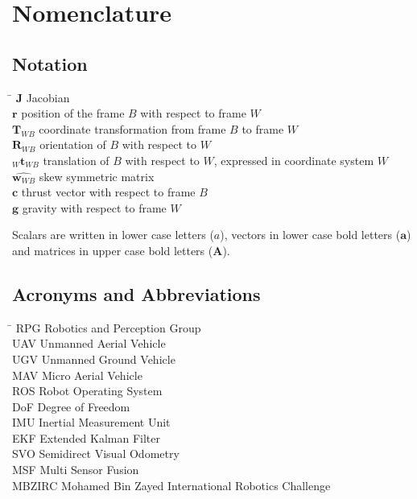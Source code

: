\chapter*{Nomenclature}\label{chap:symbole}

\section*{Notation}
  \begin{tabbing}
    \hspace*{1.6cm}   \= \kill
    $\mathbf{J}$       \> Jacobian \\[0.5ex]
    $\boldsymbol{r}$  \> position of the frame $B$ with respect to frame $W$ \\[0.5ex]
    $\mathbf{T}_{WB}$  \> coordinate transformation from frame $B$ to frame $W$ \\[0.5ex]
    $\mathbf{R}_{WB}$  \> orientation of $B$ with respect to $W$ \\[0.5ex]
    $_W\mathbf{t}_{WB}$\> translation of $B$ with respect to $W$, expressed in coordinate system $W$ \\[0.5ex]
    $\hat{\boldsymbol{w}_{WB}}$ \> skew symmetric matrix \\[0.5ex]
    $\boldsymbol{c}$  \> thrust vector with respect to frame $B$ \\[0.5ex]
    $\boldsymbol{g}$  \> gravity with respect to frame $W$ \\[0.5ex]
  \end{tabbing}
  
Scalars are written in lower case letters ($a$), vectors in lower case bold letters ($\mathbf{a}$) and matrices in upper case bold letters ($\mathbf{A}$).

\section*{Acronyms and Abbreviations}
  \begin{tabbing}
    \hspace*{1.6cm}  \= \kill
    RPG     \> Robotics and Perception Group \\[0.5ex]
    UAV     \> Unmanned Aerial Vehicle \\[0.5ex]
    UGV     \> Unmanned Ground Vehicle \\[0.5ex]
    MAV     \> Micro Aerial Vehicle \\[0.5ex]
    ROS     \> Robot Operating System \\[0.5ex]
    DoF     \> Degree of Freedom \\[0.5ex]
    IMU     \> Inertial Measurement Unit \\[0.5ex]
    EKF   \> Extended Kalman Filter \\[0.5ex]
    SVO   \> Semidirect Visual Odometry \\[0.5ex]
    MSF   \> Multi Sensor Fusion \\[0.5ex]
    MBZIRC    \> Mohamed Bin Zayed International Robotics Challenge \\[0.5ex]
  \end{tabbing}

\clearpage

